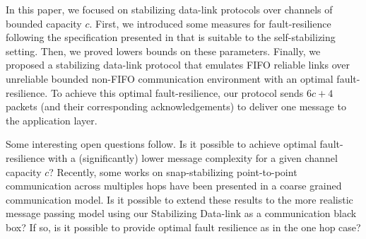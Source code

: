 \documentclass[11pt]{article}
\begin{document}
In this paper, we focused on stabilizing data-link protocols over channels of bounded capacity $c$. First, we introduced some measures for fault-resilience following the specification presented in \cite{L96b} that is suitable to the self-stabilizing setting. Then, we proved lowers bounds on these parameters. Finally, we proposed a stabilizing data-link protocol that emulates FIFO reliable links over unreliable bounded non-FIFO communication environment with an optimal fault-resilience. To achieve this optimal fault-resilience, our protocol sends $6c+4$ packets (and their corresponding acknowledgements) to deliver one message to the application layer.

Some interesting open questions follow. Is it possible to achieve optimal fault-resilience with a (significantly) lower message complexity for a given channel capacity $c$? Recently, some works on snap-stabilizing point-to-point communication \cite{CDV09ca,CDV09cb,CDLPV10c} across multiples hops have been presented in a coarse grained communication model. Is it possible to extend these results to the more realistic message passing model using our Stabilizing Data-link as a communication black box? If so, is it possible to provide optimal fault resilience as in the one hop case?



\end{document}
